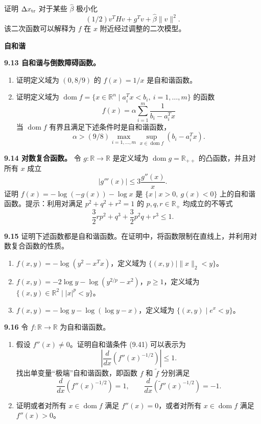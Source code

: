 \documentclass[UTF8,12pt,a4paper,fontset=fandol]{ctexart}
\begin{document}
证明 $\Delta x_{\rm tr}$ 对于某些 $\hat{\beta}$ 极小化
\[
(1/2)v^THv+g^Tv+\hat{\beta}\|v\|^2.
\]
该二次函数可以解释为 $f$ 在 $x$ 附近经过调整的二次模型。

\noindent\textbf{自和谐}

\noindent\textbf{9.13 自和谐与倒数障碍函数。}
\begin{enumerate}
\item[(a)] 证明定义域为 $(0,8/9)$ 的 $f(x)=1/x$ 是自和谐函数。
\item[(b)] 证明定义域为 $\operatorname{dom} f=\{x\in\mathbb{R}^n\mid a_i^Tx<b_i,\ i=1,\ldots,m\}$ 的函数
\[
f(x)=\alpha\sum_{i=1}^m\frac{1}{b_i-a_i^Tx}
\]
当 $\operatorname{dom} f$ 有界且满足下述条件时是自和谐函数，
\[
\alpha>(9/8)\max_{i=1,\ldots,m}\sup_{x\in\operatorname{dom} f}(b_i-a_i^Tx).
\]
\end{enumerate}

\noindent\textbf{9.14 对数复合函数。}\quad
令 $g:\mathbb{R}\to\mathbb{R}$ 是定义域为 $\operatorname{dom} g=\mathbb{R}_{++}$ 的凸函数，并且对所有 $x$ 成立
\[
|g'''(x)|\leq3\frac{g''(x)}{x}.
\]
证明 $f(x)=-\log(-g(x))-\log x$ 是 $\{x\mid x>0,\ g(x)<0\}$ 上的自和谐函数。提示：利用对满足 $p^2+q^2+r^2=1$ 的 $p,q,r\in\mathbb{R}_+$ 均成立的不等式
\[
\frac{3}{2}rp^2+q^3+\frac{3}{2}p^2q+r^3\leq1.
\]

\noindent\textbf{9.15}\quad
证明下述函数都是自和谐函数。在证明中，将函数限制在直线上，并利用对数复合函数的性质。
\begin{enumerate}
\item[(a)] $f(x,y)=-\log(y^2-x^Tx)$，定义域为 $\{(x,y)\mid \|x\|_2<y\}$。
\item[(b)] $f(x,y)=-2\log y-\log(y^{2/p}-x^2)$，$p\geq1$，定义域为 $\{(x,y)\in\mathbb{R}^2\mid |x|^p<y\}$。
\item[(c)] $f(x,y)=-\log y-\log(\log y-x)$，定义域为 $\{(x,y)\mid e^x<y\}$。
\end{enumerate}

\noindent\textbf{9.16}\quad
令 $f:\mathbb{R}\to\mathbb{R}$ 为自和谐函数。
\begin{enumerate}
\item[(a)] 假设 $f''(x)\neq0$。证明自和谐条件 (9.41) 可以表示为
\[
\left|\frac{d}{dx}\left(f''(x)^{-1/2}\right)\right|\leq1.
\]
找出单变量``极端''自和谐函数，即函数 $f$ 和 $\tilde f$ 分别满足
\[
\frac{d}{dx}\left(f''(x)^{-1/2}\right)=1,\qquad
\frac{d}{dx}\left(\tilde f''(x)^{-1/2}\right)=-1.
\]
\item[(b)] 证明或者对所有 $x\in\operatorname{dom} f$ 满足 $f''(x)=0$，或者对所有 $x\in\operatorname{dom} f$ 满足 $f''(x)>0$。
\end{enumerate}
\end{document}
